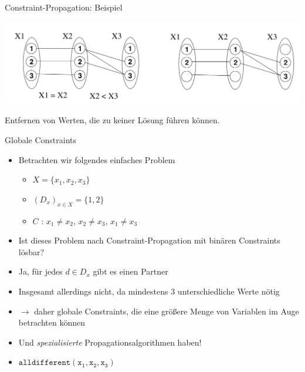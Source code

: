 \documentclass[handout,10pt,xcolor={dvipsnames},fleqn]{beamer}
\begin{document}
\begin{frame}{Constraint-Propagation: Beispiel}
\begin{center}
\includegraphics[width=\textwidth]{img/constprop.png}
\end{center}
Entfernen von Werten, die zu keiner Lösung führen können. 
\end{frame}


\begin{frame}{Globale Constraints}
\begin{itemize}
\item Betrachten wir folgendes einfaches Problem
\begin{itemize}
\item $X = \{x_1, x_2, x_3 \}$
\item $(D_x)_{x \in X} = \{1,2\}$
\item $C$ : $x_1 \neq x_2$, $x_2 \neq x_3$, $x_1 \neq x_3$
\end{itemize}
\item Ist dieses Problem nach Constraint-Propagation mit binären Constraints \alert{lösbar}? \pause
\item Ja, für jedes $d \in D_x$ gibt es einen Partner \pause 
\item Insgesamt allerdings nicht, da mindestens 3 unterschiedliche Werte nötig
\item $\rightarrow$ daher globale Constraints, die eine größere Menge von Variablen im Auge betrachten können
\item Und \emph{spezialisierte} Propagationsalgorithmen haben!
\item $\mathtt{alldifferent(x_1, x_2, x_3)}$
\end{itemize}
\end{frame}
\end{document}
